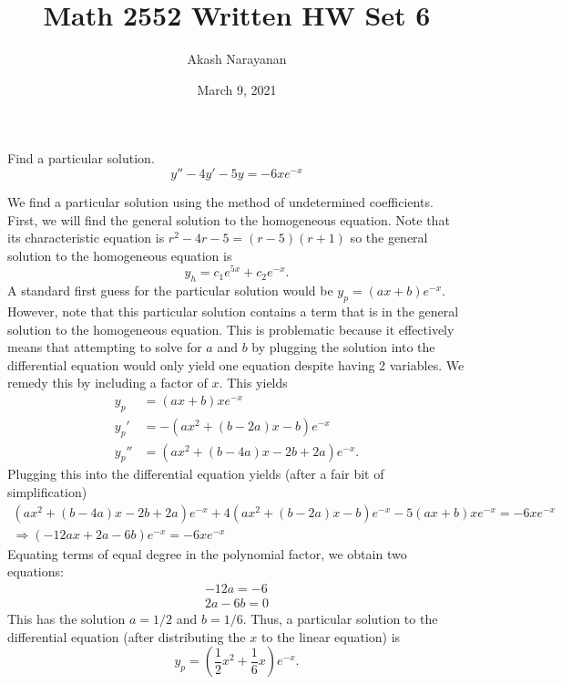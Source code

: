 \documentclass[11pt, titlepage]{article}
\title{Math 2552 Written HW Set 6}
\author{Akash Narayanan}
\date{March 9, 2021}
\begin{document}
    \maketitle

    \begin{problem}[Trench 5.4.7]
        Find a particular solution.
        \[
        y'' - 4y' - 5y = -6 x e^{-x}
        \] 
    \end{problem}

    \begin{solution}
        We find a particular solution using the method of undetermined
        coefficients. First, we will find the general solution to the homogeneous
        equation. Note that its characteristic equation is $r^2 - 4r - 5 =
        (r - 5)(r + 1)$ so the general solution to the homogeneous equation is 
        \[
        y_h = c_1 e^{5x} + c_2 e^{-x}.
        \] 
        A standard first guess for the particular solution would be $y_p = (ax +
        b) e^{-x}$. However, note that this particular solution contains a term
        that is in the general solution to the homogeneous equation. This is
        problematic because it effectively means that attempting to solve for
        $a$ and $b$ by plugging the solution into the differential equation
        would only yield one equation despite having 2 variables. We remedy this
        by including a factor of $x$. This yields
        \begin{align*}
            y_p &= (ax + b) x e^{-x} \\
            y_p' &= -(ax^2 + (b - 2a)x - b) e^{-x} \\
            y_p'' &= (ax^2 + (b - 4a) x - 2b + 2a) e^{-x}.
        \end{align*}
        Plugging this into the differential equation yields (after a fair bit of
        simplification)
        \begin{gather*}
            (ax^2 + (b - 4a) x - 2b + 2a) e^{-x} + 4 (ax^2 + (b - 2a)x - b)
            e^{-x} - 5 (ax + b) x e^{-x} = -6xe^{-x} \\
            \Longrightarrow (-12ax + 2a - 6b) e^{-x} = -6xe^{-x}
        \end{gather*}
        Equating terms of equal degree in the polynomial factor, we obtain two
        equations:
        \begin{gather*}
            -12a = -6 \\
            2a - 6b = 0
        \end{gather*}
        This has the solution $a = 1 / 2$ and $b = 1 / 6$. Thus, a particular
        solution to the differential equation (after distributing the $x$ to the
        linear equation) is
        \[
            y_p = (\frac{1}{2} x^2 + \frac{1}{6} x) e^{-x}.
        \] 
    \end{solution}
\end{document}
